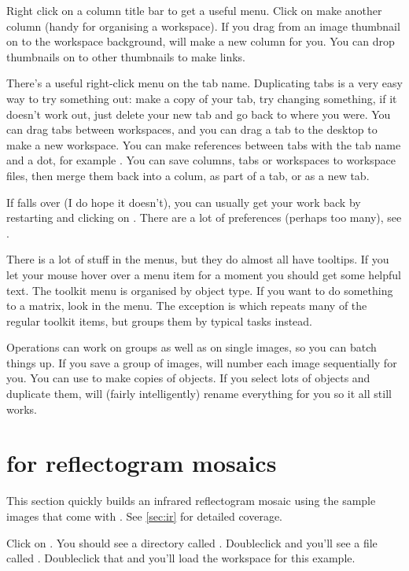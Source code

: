 Right click on a column title bar to get a useful menu. Click on
 make another column (handy for organising
a workspace). If you drag from an image thumbnail on to the workspace
background, \nip{} will make a new column for you. You can drop thumbnails
on to other thumbnails to make links.  

There's a useful right-click menu on the tab name. Duplicating tabs is a
very easy way to try something out: make a copy of your tab, try changing
something, if it doesn't work out, just delete your new tab and go back to
where you were. You can drag tabs between workspaces, and you can drag a
tab to the desktop to make a new workspace. You can make references between
tabs with the tab name and a dot, for example {}. You can save
columns, tabs or workspaces to workspace files, then merge them back into
a colum, as part of a tab, or as a new tab.

If \nip{} falls over (I do hope
it doesn't), you can usually get your work back by restarting \nip{} and
clicking on .  There are a lot
of preferences (perhaps too many), see .

There is a lot of stuff in the  menus, but they do almost
all have tooltips. If you let your mouse hover over a menu item for a
moment you should get some helpful text. The toolkit menu is organised by
object type. If you want to do something to a matrix, look in the
 menu. The exception is 
which repeats many of the regular toolkit items, but groups them by typical
tasks instead.

Operations can work on groups as well as on single images, so you can batch
things up. If you save a group of images, \nip{} will number each image
sequentially for you.  You can use  to make copies
of objects. If you select lots of objects and duplicate them, \nip{} will
(fairly intelligently) rename everything for you so it all still works.

\section{\nip{} for reflectogram mosaics}

This section quickly builds an infrared reflectogram mosaic using the
sample images that come with \nip{}. See \cref{sec:ir} for detailed
coverage.

Click on . 
You should see a directory called . Doubleclick and
you'll see a file called . Doubleclick that and you'll load
the workspace for this example.

